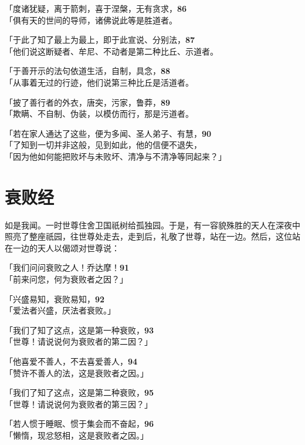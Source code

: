 「度诸犹疑，离于箭刺，喜于涅槃，无有贪求，\hfill{\grayfootnotesize \textbf{86}} \\
「俱有天的世间的导师，诸佛说此等是胜道者。


「于此了知了最上为最上，即于此宣说、分别法，\hfill{\grayfootnotesize \textbf{87}} \\
「他们说这断疑者、牟尼、不动者是第二种比丘、示道者。


「于善开示的法句依道生活，自制，具念，\hfill{\grayfootnotesize \textbf{88}} \\
「从事着无过的行迹，他们说第三种比丘是活道者。


「披了善行者的外衣，唐突，污家，鲁莽，\hfill{\grayfootnotesize \textbf{89}} \\
「欺瞒、不自制、伪装，以模仿而行，那是污道者。


「若在家人通达了这些，便为多闻、圣人弟子、有慧，\hfill{\grayfootnotesize \textbf{90}} \\
「了知到一切并非这般，见到如此，他的信便不退失，\\
「因为他如何能把败坏与未败坏、清净与不清净等同起来？」


\section{衰败经}

如是我闻。一时世尊住舍卫国祇树给孤独园。于是，有一容貌殊胜的天人在深夜中照亮了整座祇园，往世尊处走去，走到后，礼敬了世尊，站在一边。然后，这位站在一边的天人以偈颂对世尊说：


「我们问问衰败之人！乔达摩！\hfill{\grayfootnotesize \textbf{91}} \\
「前来问您，何为衰败者之因？」


「兴盛易知，衰败易知，\hfill{\grayfootnotesize \textbf{92}} \\
「爱法者兴盛，厌法者衰败。」


「我们了知了这点，这是第一种衰败，\hfill{\grayfootnotesize \textbf{93}} \\
「世尊！请说说何为衰败者的第二因？」


「他喜爱不善人，不去喜爱善人，\hfill{\grayfootnotesize \textbf{94}} \\
「赞许不善人的法，这是衰败者之因。」


「我们了知了这点，这是第二种衰败，\hfill{\grayfootnotesize \textbf{95}} \\
「世尊！请说说何为衰败者的第三因？」

「若人惯于睡眠、惯于集会而不奋起，\hfill{\grayfootnotesize \textbf{96}} \\
「懒惰，现忿怒相，这是衰败者之因。」


